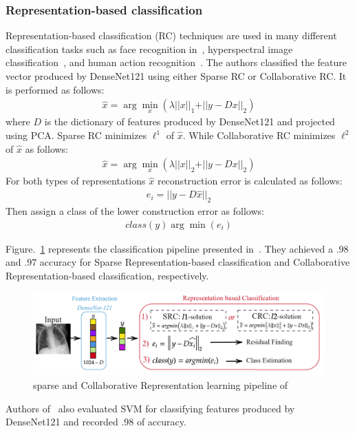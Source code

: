 \subsubsection{Representation-based classification}
 Representation-based classification (RC) techniques are used in many different classification tasks such as face recognition in~\cite{wright2010sparse}, hyperspectral image classification~\cite{li2016survey}, and human action recognition~\cite{guha2011learning}. The authors classified the feature vector produced by DenseNet121 using either Sparse RC or Collaborative RC. It is performed as follows\cite{ar}:
 \begin{equation}
    \begin{split}
        \hat{x} = \arg \min_{x}(\lambda \vert \vert x \vert\vert_{1} + \vert\vert y - Dx \vert\vert_{2})
    \end{split}
\end{equation}
where $D$ is the dictionary of features produced by DenseNet121 and projected using PCA. Sparse RC minimizes $\ell^{1}$ of $\hat{x}$. While Collaborative RC minimizes $\ell^{2}$ of $\hat{x}$ as follows:
\begin{equation}
    \begin{split}
        \hat{x} = \arg \min_{x}(\lambda \vert \vert x \vert\vert_{2} + \vert\vert y - Dx \vert\vert_{2})
    \end{split}
\end{equation}
For both types of representations $\hat{x}$ reconstruction error is calculated as follows:
\begin{equation}
    \begin{split}
        e_i = \vert\vert y - D\hat{x} \vert\vert_2
    \end{split}
\end{equation}
Then assign a class of the lower construction error as follows:
\begin{equation}
    \begin{split}
        class(y) \arg \min(e_i)
    \end{split}
\end{equation}

Figure.~\ref{fig:RC} represents the classification pipeline presented in~\cite{ar}. They achieved a $.98$ and $.97$ accuracy for Sparse Representation-based classification and Collaborative Representation-based classification, respectively. 
\begin{figure}
    \centering
    \includegraphics[width=\textwidth]{Figures/RCpipline.png}
    \caption{\label{fig:RC} sparse and Collaborative Representation learning pipeline of~\cite{ar}}
\end{figure}
Authors of~\cite{ar} also evaluated SVM for classifying features produced by DenseNet121 and recorded $.98$ of accuracy.

